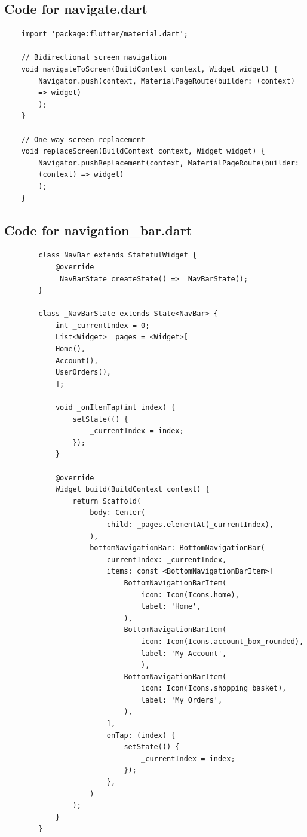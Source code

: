 \documentclass[12pt]{article}
\begin{document}
	\subsection{Code for navigate.dart}
	\label{code:navigate}
	\begin{verbatim}
	import 'package:flutter/material.dart';
	
	// Bidirectional screen navigation
	void navigateToScreen(BuildContext context, Widget widget) {
		Navigator.push(context, MaterialPageRoute(builder: (context) 
		=> widget)
		);
	}
	
	// One way screen replacement
	void replaceScreen(BuildContext context, Widget widget) {
		Navigator.pushReplacement(context, MaterialPageRoute(builder: 
		(context) => widget)
		);
	}	
	\end{verbatim}


	\subsection{Code for navigation\_bar.dart}
	\label{code:nav-bar}
	\begin{verbatim}
		class NavBar extends StatefulWidget {
			@override
			_NavBarState createState() => _NavBarState();
		}
		
		class _NavBarState extends State<NavBar> {
			int _currentIndex = 0;
			List<Widget> _pages = <Widget>[
			Home(),
			Account(),
			UserOrders(),
			];
			
			void _onItemTap(int index) {
				setState(() {
					_currentIndex = index;
				});
			}
			
			@override
			Widget build(BuildContext context) {
				return Scaffold(
					body: Center(
						child: _pages.elementAt(_currentIndex),
					),
					bottomNavigationBar: BottomNavigationBar(
						currentIndex: _currentIndex,
						items: const <BottomNavigationBarItem>[
							BottomNavigationBarItem(
								icon: Icon(Icons.home),
								label: 'Home',
							),
							BottomNavigationBarItem(
								icon: Icon(Icons.account_box_rounded),
								label: 'My Account',
								),
							BottomNavigationBarItem(
								icon: Icon(Icons.shopping_basket),
								label: 'My Orders',
							),
						],
						onTap: (index) {
							setState(() {
								_currentIndex = index;
							});
						},
					)
				);
			}
		}
	\end{verbatim}
\end{document}
